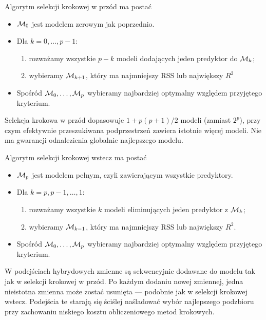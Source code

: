 \documentclass{myclass}
\begin{document}
Algorytm selekcji krokowej w przód ma postać
\begin{itemize}
\item \(\mathcal{M}_0\) jest modelem zerowym jak poprzednio.
\item Dla \(k=0,\ldots,p-1\):
    \begin{enumerate}
    \item rozważamy wszystkie \(p-k\) modeli dodających jeden predyktor do \(\mathcal{M}_k\);
    \item wybieramy \(\mathcal{M}_{k+1}\), który ma najmniejszy RSS lub największy \(R^2\)    
    \end{enumerate}
\item Spośród \(\mathcal{M}_0,\ldots,\mathcal{M}_p\) wybieramy najbardziej optymalny względem przyjętego
kryterium.
\end{itemize}
Selekcja krokowa w przód dopasowuje \(1 + p(p+1)/2\) modeli (zamiast \(2^p\)), przy czym efektywnie
przeszukiwana podprzestrzeń zawiera istotnie więcej modeli. Nie ma gwarancji odnalezienia globalnie
najlepszego modelu.

Algorytm selekcji krokowej wstecz ma postać
\begin{itemize}
\item \(\mathcal{M}_p\) jest modelem pełnym, czyli zawierającym wszystkie predyktory.
\item Dla \(k=p,p-1,\ldots,1\):
    \begin{enumerate}
    \item rozważamy wszystkie \(k\) modeli eliminujących jeden predyktor z \(\mathcal{M}_k\);
    \item wybieramy \(\mathcal{M}_{k-1}\), który ma najmniejszy RSS lub największy \(R^2\).
    \end{enumerate}
\item Spośród \(\mathcal{M}_0,\ldots,\mathcal{M}_p\) wybieramy najbardziej optymalny względem przyjętego
kryterium.
\end{itemize}

W podejściach hybrydowych zmienne są sekwencyjnie dodawane do modelu tak jak w selekcji krokowej w
przód. Po każdym dodaniu nowej zmiennej, jedna nieistotna zmienna może zostać usunięta — podobnie
jak w selekcji krokowej wstecz. Podejścia te starają się ściślej naśladować wybór najlepszego
podzbioru przy zachowaniu niskiego kosztu obliczeniowego metod krokowych.

\end{document}
